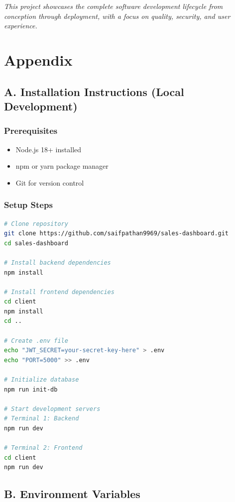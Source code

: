 \documentclass[12pt,a4paper]{article}
\begin{document}
\vspace{1cm}

\textit{This project showcases the complete software development lifecycle from conception through deployment, with a focus on quality, security, and user experience.}

\newpage

\section{Appendix}


\subsection{A. Installation Instructions (Local Development)}

\subsubsection{Prerequisites}
\begin{itemize}[leftmargin=*]
    \item Node.js 18+ installed
    \item npm or yarn package manager
    \item Git for version control
\end{itemize}

\subsubsection{Setup Steps}

\begin{lstlisting}[language=bash]
# Clone repository
git clone https://github.com/saifpathan9969/sales-dashboard.git
cd sales-dashboard

# Install backend dependencies
npm install

# Install frontend dependencies
cd client
npm install
cd ..

# Create .env file
echo "JWT_SECRET=your-secret-key-here" > .env
echo "PORT=5000" >> .env

# Initialize database
npm run init-db

# Start development servers
# Terminal 1: Backend
npm run dev

# Terminal 2: Frontend
cd client
npm run dev
\end{lstlisting}

\subsection{B. Environment Variables}
\end{document}
